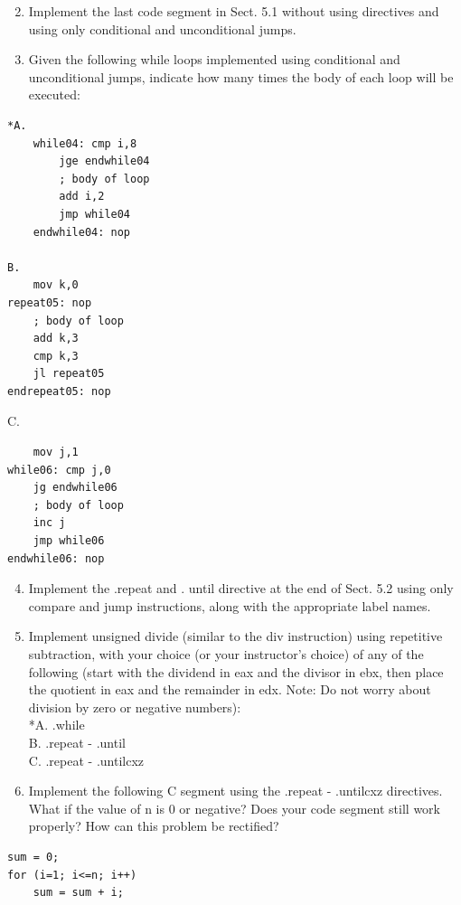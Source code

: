 \documentclass[10pt]{article}
\begin{document}
\begin{enumerate}
  \setcounter{enumi}{1}
  \item Implement the last code segment in Sect. 5.1 without using directives and using only conditional and unconditional jumps.
  \item Given the following while loops implemented using conditional and unconditional jumps, indicate how many times the body of each loop will be executed:
\end{enumerate}

\begin{verbatim}
*A.
    while04: cmp i,8
        jge endwhile04
        ; body of loop
        add i,2
        jmp while04
    endwhile04: nop

B.
    mov k,0
repeat05: nop
    ; body of loop
    add k,3
    cmp k,3
    jl repeat05
endrepeat05: nop
\end{verbatim}

C.

\begin{verbatim}
    mov j,1
while06: cmp j,0
    jg endwhile06
    ; body of loop
    inc j
    jmp while06
endwhile06: nop
\end{verbatim}

\begin{enumerate}
  \setcounter{enumi}{3}
  \item Implement the .repeat and . until directive at the end of Sect. 5.2 using only compare and jump instructions, along with the appropriate label names.
  \item Implement unsigned divide (similar to the div instruction) using repetitive subtraction, with your choice (or your instructor's choice) of any of the following (start with the dividend in eax and the divisor in ebx, then place the quotient in eax and the remainder in edx. Note: Do not worry about division by zero or negative numbers):\\
*A. .while\\
B. .repeat - .until\\
C. .repeat - .untilcxz
  \item Implement the following C segment using the .repeat - .untilcxz directives. What if the value of n is 0 or negative? Does your code segment still work properly? How can this problem be rectified?
\end{enumerate}

\begin{verbatim}
sum = 0;
for (i=1; i<=n; i++)
    sum = sum + i;
\end{verbatim}
\end{document}
